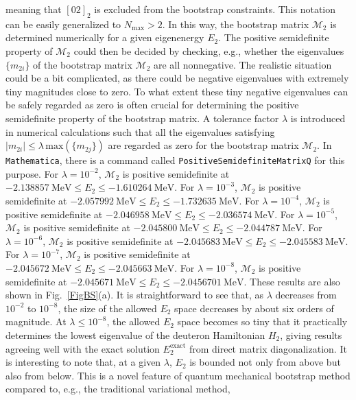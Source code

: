 \documentclass[aps,prc,reprint,superscriptaddress,nofootinbib]{revtex4-2}
\begin{document}
\begin{widetext}
meaning that $[02]_2$ is excluded from the bootstrap constraints.
This notation can be easily generalized to $N_\text{max}>2$.
In this way, the bootstrap matrix $\bm{\mathcal{M}}_2$
is determined numerically for a given eigenenergy $E_2$.
The positive semidefinite property of $\bm{\mathcal{M}}_2$ 
could then be decided by checking, e.g., whether the eigenvalues $\{m_{2i}\}$ of the bootstrap matrix $\bm{\mathcal{M}}_2$ are all nonnegative. 
The realistic situation could be a bit complicated, as there could be negative eigenvalues with extremely tiny magnitudes close to zero.
To what extent these tiny negative eigenvalues can be safely regarded as zero is often crucial for determining the positive semidefinite property of the bootstrap matrix. 
A tolerance factor $\lambda$ is introduced in numerical calculations such that 
all the eigenvalues satisfying $|m_{2i}|\leq \lambda\, \text{max}(\{m_{2j}\})$
are regarded as zero for the bootstrap matrix $\bm{\mathcal{M}}_2$.
In \texttt{Mathematica}, there is a command called \texttt{PositiveSemidefiniteMatrixQ} for this purpose.
For $\lambda=10^{-2}$, $\bm{\mathcal{M}}_2$ is positive semidefinite at $-2.138857\ \text{MeV}\leq E_2\leq-1.610264\ \text{MeV}$.
For $\lambda=10^{-3}$, $\bm{\mathcal{M}}_2$ is positive semidefinite at $-2.057992\ \text{MeV}\leq E_2\leq-1.732635\ \text{MeV}$.
For $\lambda=10^{-4}$, $\bm{\mathcal{M}}_2$ is positive semidefinite at $-2.046958\ \text{MeV}\leq E_2\leq-2.036574\ \text{MeV}$.
For $\lambda=10^{-5}$, $\bm{\mathcal{M}}_2$ is positive semidefinite at $-2.045800\ \text{MeV}\leq E_2\leq-2.044787\ \text{MeV}$.
For $\lambda=10^{-6}$, $\bm{\mathcal{M}}_2$ is positive semidefinite at $-2.045683\ \text{MeV}\leq E_2\leq-2.045583\ \text{MeV}$.
For $\lambda=10^{-7}$, $\bm{\mathcal{M}}_2$ is positive semidefinite at $-2.045672\ \text{MeV}\leq E_2\leq-2.045663\ \text{MeV}$.
For $\lambda=10^{-8}$, $\bm{\mathcal{M}}_2$ is positive semidefinite at $-2.045671\ \text{MeV}\leq E_2\leq-2.0456701\ \text{MeV}$.
These results are also shown in Fig.~\ref{FigBS}(a).
It is straightforward to see that, as $\lambda$ decreases from $10^{-2}$ to $10^{-8}$,
the size of the allowed $E_2$ space decreases by about six orders of magnitude.
At $\lambda\leq 10^{-8}$,
the allowed $E_2$ space becomes so tiny that it practically determines the lowest eigenvalue of the deuteron Hamiltonian $H_2$,
giving results agreeing well with the exact solution $E^\text{exact}_2$ from direct matrix diagonalization.
It is interesting to note that, at a given $\lambda$, $E_2$ is bounded not only from above but also from below.
This is a novel feature of quantum mechanical bootstrap method compared to, e.g., the traditional variational method,

\end{widetext}
\end{document}
